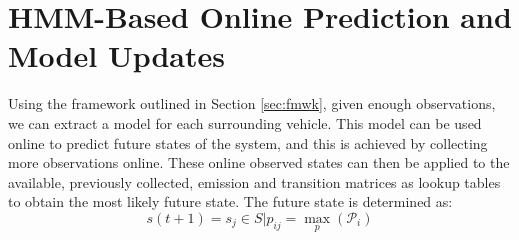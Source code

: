 \documentclass[letterpaper, 10 pt, conference]{ieeeconf}  %
\newcommand\NB[1]{$\spadesuit$\footnote{NB: #1}}
\begin{document}
\section{HMM-Based Online Prediction and Model Updates} \label{sec:ahmmpredupdate} %
  Using the framework outlined in Section \ref{sec:fmwk}, given enough observations, we can extract a model for each surrounding vehicle. This model can be used online to predict future states of the system, and this is achieved by collecting more observations online. These online observed states can then be applied to the available, previously collected, emission and transition matrices as lookup tables to obtain the most likely future state. The future state is determined as:
\begin{equation} \label{eq:pred}
   s(t+1) = s_j \in S \vert p_{ij}=\max_p(\mathcal{P}_i)
\end{equation}
\end{document}
